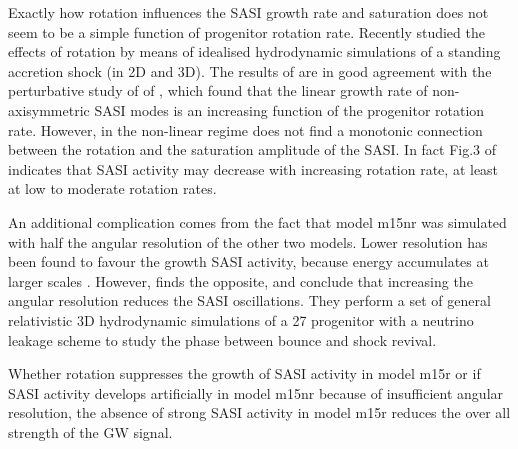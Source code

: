 Exactly how rotation influences the SASI growth rate and saturation does not seem to 
be a simple function of progenitor rotation rate. Recently \cite{blondin_17} studied the effects 
of rotation by means of idealised hydrodynamic simulations of a standing accretion shock (in 2D and 3D). 
The results of \cite{blondin_17} are in good agreement with the perturbative study of of \cite{yamasaki_08}, 
which found that the linear growth rate 
of non-axisymmetric SASI modes is an increasing function of the progenitor rotation rate.
However, in the non-linear regime \cite{kazeroni_17} does not find a monotonic connection between the
rotation and the saturation amplitude of the SASI. In fact Fig.3 of \cite{kazeroni_17} indicates that
SASI activity may decrease with increasing rotation rate, at least at low to moderate rotation rates. 

An additional complication comes from the fact that model m15nr was simulated with 
half the angular resolution of the other two models. Lower resolution has been found
to favour the growth SASI activity, because energy accumulates at larger scales \citep{hanke_12}.
However, \cite{abdikamalov_15} finds the opposite, and conclude that increasing the angular resolution 
reduces the SASI oscillations. They perform a set of general relativistic 3D hydrodynamic
simulations of a 27 \msun progenitor with a neutrino leakage scheme to study the phase between bounce and
shock revival.

Whether rotation suppresses the growth of SASI activity in model m15r or if SASI activity develops
artificially in model m15nr because of insufficient angular resolution, the absence of strong SASI activity in model
m15r reduces the over all strength of the GW signal. 


